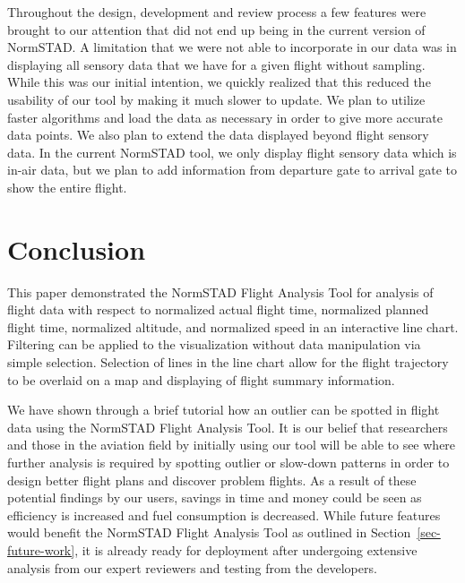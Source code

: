 \documentclass{sig-alternate}
\begin{document}
Throughout the design, development and review process a few features were brought to 
our attention that did not end up being in the current version of NormSTAD. 
A limitation that we were not able to incorporate in our data was in displaying
all sensory data that we have for a given flight without sampling. While this was
our initial intention, we quickly realized that this reduced the usability
of our tool by making it much slower to update.
We plan to utilize faster algorithms and load the data as necessary 
in order to give more accurate data points. We also plan
to extend the data displayed beyond flight sensory data. In the current NormSTAD tool, 
we only display flight sensory data which is 
in-air data, but we plan to add information from 
departure gate to arrival gate to show the entire flight. 

\section{Conclusion}
\label{sec-conclusion}

This paper demonstrated the NormSTAD Flight Analysis Tool for analysis of flight data
with respect to normalized actual flight time, normalized planned flight time, normalized
altitude, and normalized speed in an interactive line chart. Filtering can be applied
to the visualization without data manipulation via simple selection. Selection
of lines in the line chart allow for the flight trajectory to be overlaid on a map
and displaying of flight summary information.

We have shown through a brief tutorial how an outlier can be spotted in flight data
using the NormSTAD Flight Analysis Tool.
It is our belief
that researchers and those in the aviation field by initially
using our tool will be able to see where further analysis is required
by spotting outlier or slow-down patterns
in order to design better flight plans and
discover problem flights.
As a result of these potential findings by our users,
savings in time and money could be seen as efficiency is increased and fuel consumption
is decreased. While future features would benefit the NormSTAD Flight Analysis Tool
as outlined in Section~\ref{sec-future-work}, it is already ready for deployment after
undergoing extensive analysis from our expert reviewers and testing from the developers.
\end{document}
